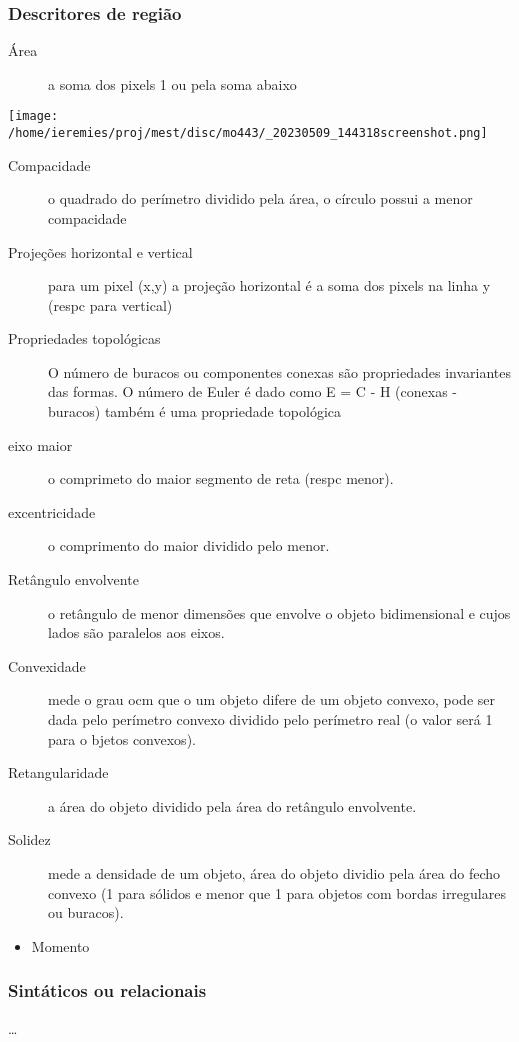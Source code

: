 \documentclass[twocolumn, 10pt]{article}
\begin{document}
\subsubsection*{Descritores de região}
\label{sec:orgc6f45e5}
\begin{description}
\item[{Área}] a soma dos pixels 1 ou pela soma abaixo
\end{description}
\begin{center}
\texttt{[image: /home/ieremies/proj/mest/disc/mo443/\_20230509\_144318screenshot.png]}
\end{center}
\begin{description}
\item[{Compacidade}] o quadrado do perímetro dividido pela área, o círculo possui a menor compacidade
\item[{Projeções horizontal e vertical}] para um pixel (x,y) a projeção horizontal é a soma dos pixels na linha y (respc para vertical)
\item[{Propriedades topológicas}] O número de buracos ou componentes conexas são propriedades invariantes das formas.
O número de Euler é dado como E = C - H (conexas - buracos) também é uma propriedade topológica
\item[{eixo maior}] o comprimeto do maior segmento de reta (respc menor).
\item[{excentricidade}] o comprimento do maior dividido pelo menor.
\item[{Retângulo envolvente}] o retângulo de menor dimensões que envolve o objeto bidimensional e cujos lados são paralelos aos eixos.
\item[{Convexidade}] mede o grau ocm que o um objeto difere de um objeto convexo, pode ser dada pelo perímetro convexo dividido pelo perímetro real (o valor será 1 para o bjetos convexos).
\item[{Retangularidade}] a área do objeto dividido pela área do retângulo envolvente.
\item[{Solidez}] mede a densidade de um objeto, área do objeto dividio pela área do fecho convexo (1 para sólidos e menor que 1 para objetos com bordas irregulares ou buracos).
\end{description}
\begin{itemize}
\item Momento
\label{sec:orgdd21872}
\end{itemize}
\subsubsection*{Sintáticos ou relacionais}
\label{sec:org5e0afed}
\ldots{}
\end{document}
